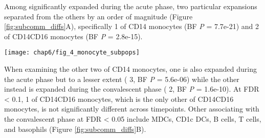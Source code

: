 Among \subcommunities{} significantly expanded during the acute phase, two particular expansions separated from the others by an order of magnitude (Figure \ref{fig:subcomm_diffs}A), specifically \subcommunity{} 1 of CD14\sups{+} monocytes (BF \emph{P} = 7.7e-21) and \subcommunity{} 2 of CD14\sups{+}\allowbreak CD16\sups{+} monocytes (BF \emph{P} = 2.8e-15).
\begin{figure*}[htb]
  \centering
  \texttt{[image: chap6/fig\_4\_monocyte\_subpops]}
  \caption[Marker expression differences between sub-communities of CD14\sups{+}\allowbreak CD16\sups{+} monocytes and CD14\sups{+} monocytes]{
  \textbf{Marker expression differences between sub-communities of CD14\sups{+}\allowbreak CD16\sups{+} monocytes and CD14\sups{+} monocytes}, depicted as boxplots of the mean expression levels for all samples. A, relative expression of CD14\sups{+} and CD16\sups{+} in CD14\sups{+}CD16\sups{+} sub-communities indicates that sub-community 1 is a CD14\sups{+}CD16\sups{++} (aka “non-classical”) phenotype, while sub-community 2 is a CD14\sups{++}CD16\sups{+} (aka “intermediate”) phenotype. Differences shown here are significant at FDR < 0.05; for a view of all differences significant at this threshold, see Appendix Figure \ref{fig:cd14cd16_channel_diffs}. B, relative expression of six markers that most differentiate (by the difference in medians) sub-community 1 of CD14\sups{+} monocytes from the other sub-communities. C, relative expression of six markers that most differentiate (by the difference in medians) sub-community 3 of CD14\sups{+} monocytes from the other sub-communities. Note: Channels shown in B and C are a subset of the differences that are significant at FDR < 0.05; for a view of all differences significant at FDR < 0.05 see Appendix Figure \ref{fig:cd14_channel_diffs}.
  }
  \label{fig:subcomm_marker_diffs}
\end{figure*}
When examining the other two \subcommunities{} of CD14\sups{+} monocytes, one is also expanded during the acute phase but to a lesser extent (\subcommunity{} 3, BF \emph{P} = 5.6e-06) while the other instead is expanded during the convalescent phase (\subcommunity{} 2, BF \emph{P} = 1.6e-10). At FDR < 0.1, \subcommunity{} 1 of CD14\sups{+}\allowbreak CD16\sups{+} monocytes, which is the only other \subcommunity{} of CD14\sups{+}\allowbreak CD16\sups{+} monocytes, is not significantly different across timepoints. Other \subcommunities{} associating with the convalescent phase at FDR < 0.05 include MDCs, CD1c DCs, B cells, T cells, and basophils (Figure \ref{fig:subcomm_diffs}B).

